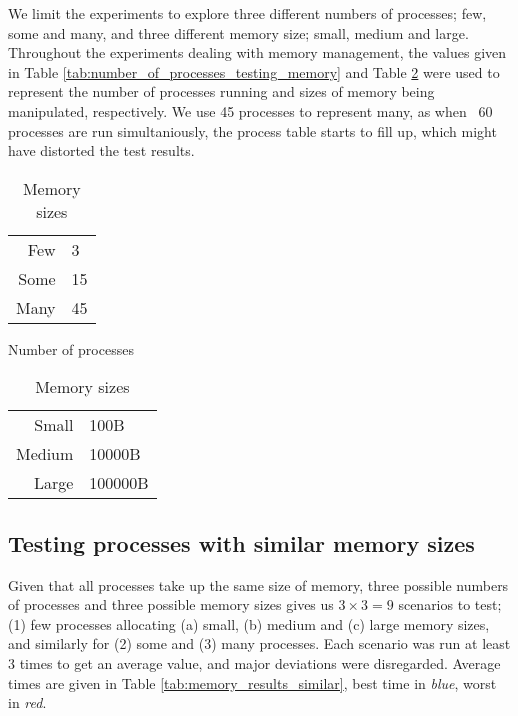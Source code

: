 \documentclass[11pt]{article}
\begin{document}
We limit the experiments to explore three different numbers of processes; few, some and many, and three different memory size; small, medium and large. Throughout the experiments dealing with memory management, the values given in Table \ref{tab:number_of_processes_testing_memory} and Table \ref{tab:memory_sizes} were used to represent the number of processes running and sizes of memory being manipulated, respectively. We use 45 processes to represent many, as when ~60 processes are run simultaniously, the process table starts to fill up, which might have distorted the test results.

\begin{table}[H]
	\begin{minipage}{.5\textwidth}
		\begin{center}
			\begin{tabular}{ r | l }
			Few & 3\\
			Some & 15\\
			Many & 45
			\end{tabular}
		
			\caption{Number of processes}
			\label{tab:number_of_processes_testing_memory}
		\end{center}
	\end{minipage}
	\begin{minipage}{.5\textwidth}
		\begin{center}
			\begin{tabular}{ r | l }
			Small & 100B\\
			Medium & 10000B\\
			Large & 100000B
			\end{tabular}
			
			\caption{Memory sizes}
			\label{tab:memory_sizes}
		\end{center}
	\end{minipage}
\end{table}

\subsection{Testing processes with similar memory sizes}
Given that all processes take up the same size of memory, three possible numbers of processes and three possible memory sizes gives us $ 3 \times 3 = 9 $ scenarios to test; (1) few processes allocating (a) small, (b) medium and (c) large memory sizes, and similarly for (2) some and (3) many processes. Each scenario was run at least 3 times to get an average value, and major deviations were disregarded. Average times are given in Table \ref{tab:memory_results_similar}, best time in \emph{\color{MidnightBlue}blue}, worst in \emph{\color{BrickRed}red}.
\end{document}
